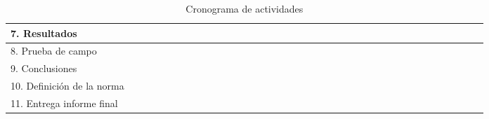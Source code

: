 \begin{table}[htbp]
{\begin{tabular}{|lr|r|r|r|r|r|r|r|r|r|r|r|r|r|r|r|r|r|r|r|r|r|r|r|r|r|r|r|r|r|r|r|r|r|r|r|r|}
    \hline
    \multicolumn{2}{|l|}{7. Resultados} &       &       &       &       &       &       &       &       &       &       &       &       &       &       &       &       & \cellcolor[rgb]{ .357,  .608,  .835} & \cellcolor[rgb]{ .357,  .608,  .835} & \cellcolor[rgb]{ .357,  .608,  .835} & \cellcolor[rgb]{ .357,  .608,  .835} & \cellcolor[rgb]{ .357,  .608,  .835} & \cellcolor[rgb]{ .357,  .608,  .835} & \cellcolor[rgb]{ .357,  .608,  .835} & \cellcolor[rgb]{ .357,  .608,  .835} &       &       &       &       &       &       &       &       &       &       &       &  \\
    \hline
    \multicolumn{2}{|l|}{8. Prueba de campo} &       &       &       &       &       &       &       &       &       &       &       &       &       &       &       &       &       &       &       &       &       &       &       &       &       & \cellcolor[rgb]{ .357,  .608,  .835} & \cellcolor[rgb]{ .357,  .608,  .835} & \cellcolor[rgb]{ .357,  .608,  .835} & \cellcolor[rgb]{ .357,  .608,  .835} &       &       &       &       &       &       &  \\
    \hline
    \multicolumn{2}{|l|}{9. Conclusiones} &       &       &       &       &       &       &       &       &       &       &       &       &       &       &       &       &       &       &       &       &       &       &       &       &       &       &       &       &       & \cellcolor[rgb]{ .357,  .608,  .835} & \cellcolor[rgb]{ .357,  .608,  .835} &       &       &       &       &  \\
    \hline
    \multicolumn{2}{|l|}{10. Definici\'{o}n de la norma} &       &       &       &       &       &       &       &       &       &       &       &       &       &       &       &       &       &       &       &       &       &       &       &       &       &       &       &       &       &       &       & \cellcolor[rgb]{ .357,  .608,  .835} & \cellcolor[rgb]{ .357,  .608,  .835} &       &       &  \\
    \hline
    \multicolumn{2}{|l|}{11. Entrega informe final} &       &       &       &       &       &       &       &       &       &       &       &       &       &       &       &       &       &       &       &       &       &       &       &       &       &       &       &       &       &       &       &       &       & \cellcolor[rgb]{ .357,  .608,  .835} & \cellcolor[rgb]{ .357,  .608,  .835} &  \\
    \hline
    \end{tabular}%
    }
    \caption{Cronograma de actividades}
  \label{tab:addlabel}%
\end{table}%

